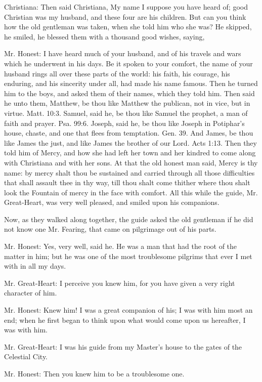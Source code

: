 Christiana: Then said Christiana, My name I suppose you have heard of; good Christian was my husband, and these four are his children. But can you think how the old gentleman was taken, when she told him who she was? He skipped, he smiled, he blessed them with a thousand good wishes, saying,

Mr. Honest: I have heard much of your husband, and of his travels and wars which he underwent in his days. Be it spoken to your comfort, the name of your husband rings all over these parts of the world: his faith, his courage, his enduring, and his sincerity under all, had made his name famous. Then he turned him to the boys, and asked them of their names, which they told him. Then said he unto them, Matthew, be thou like Matthew the publican, not in vice, but in virtue. Matt. 10:3. Samuel, said he, be thou like Samuel the prophet, a man of faith and prayer. Psa. 99:6. Joseph, said he, be thou like Joseph in Potiphar's house, chaste, and one that flees from temptation. Gen. 39. And James, be thou like James the just, and like James the brother of our Lord. Acts 1:13. Then they told him of Mercy, and how she had left her town and her kindred to come along with Christiana and with her sons. At that the old honest man said, Mercy is thy name: by mercy shalt thou be sustained and carried through all those difficulties that shall assault thee in thy way, till thou shalt come thither where thou shalt look the Fountain of mercy in the face with comfort. All this while the guide, Mr. Great-Heart, was very well pleased, and smiled upon his companions.

Now, as they walked along together, the guide asked the old gentleman if he did not know one Mr. Fearing, that came on pilgrimage out of his parts.

Mr. Honest: Yes, very well, said he. He was a man that had the root of the matter in him; but he was one of the most troublesome pilgrims that ever I met with in all my days.

Mr. Great-Heart: I perceive you knew him, for you have given a very right character of him.

Mr. Honest: Knew him! I was a great companion of his; I was with him most an end; when he first began to think upon what would come upon us hereafter, I was with him.

Mr. Great-Heart: I was his guide from my Master's house to the gates of the Celestial City.

Mr. Honest: Then you knew him to be a troublesome one.

